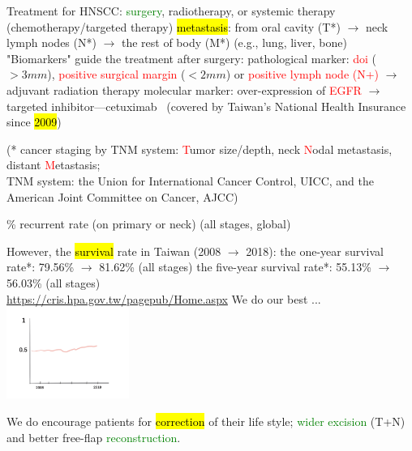 \documentclass[
paper=landscape,
paper=160mm:90mm, %
fontsize=11pt, %
pagesize, %
parskip=half-, %
]{scrartcl} %
\theoremstyle{mythmstyle} %
\begin{document}
\begin{outline}
\1  Treatment for HNSCC: \textcolor{green}{surgery}, radiotherapy, or systemic therapy (chemotherapy/targeted therapy)
    \2 \hl{metastasis}: from oral cavity (T*) $\longrightarrow$ neck lymph nodes (N*) $\longrightarrow$ the rest of body (M*) (e.g., lung, liver, bone)
    \2 "Biomarkers" guide the treatment after surgery:
        \3 pathological marker: \textcolor{red}{\acrfull{doi}} ($> 3 mm$), \textcolor{red}{positive surgical margin} ($< 2 mm$) or \textcolor{red}{positive lymph node (N+)} $\longrightarrow$ adjuvant radiation therapy %
        \3 molecular marker: over-expression of \textcolor{red}{EGFR} $\longrightarrow$ targeted inhibitor---cetuximab~\autocite{LeTourneau2007} \hfill {\tiny (covered by Taiwan's National Health Insurance since \hl{2009})}
        
        {\tiny (* cancer staging by TNM system: \textcolor{red}{T}umor size/depth, neck \textcolor{red}{N}odal metastasis, distant \textcolor{red}{M}etastasis; \\
        TNM system: the Union for International Cancer Control, UICC, and
        the American Joint Committee on Cancer, AJCC)}
\clearpage

\% recurrent rate (on primary or neck) (all stages, global)~\autocite{Forastiere2001,Warnakulasuriya2009}

\1 However, the \hl{survival} rate in Taiwan (2008 $\longrightarrow$ 2018):
    \2 the one-year survival rate*: 79.56\% $\longrightarrow$ 81.62\% (all stages)
    \2 the five-year survival rate*: 55.13\% $\longrightarrow$ 56.03\% (all stages) \\
    {\tiny * \url{https://cris.hpa.gov.tw/pagepub/Home.aspx}}
\1 We do our best ...
\includegraphics[width=4cm]{stationary_survival_Artwork 2.jpg}


\clearpage


\1 We do
    \2 encourage patients for \hl{correction} of their life style;
    \2 \textcolor{green}{wider excision} (T+N) and better free-flap \textcolor{green}{reconstruction}.
\end{outline}
\end{document}
